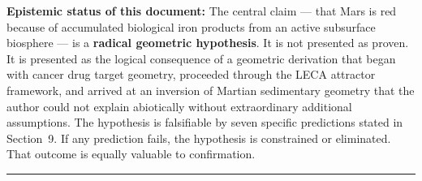 \documentclass[11pt, a4paper]{article}
\begin{document}
\vspace{1em}

\begin{mdframed}[
  linecolor=rulecolor,
  linewidth=0.8pt,
  innertopmargin=0.5em,
  innerbottommargin=0.5em,
  innerleftmargin=1em,
  innerrightmargin=1em
]
\small
\textbf{Epistemic status of this document:}
The central claim --- that Mars is red because
of accumulated biological iron products from an
active subsurface biosphere --- is a
\textbf{radical geometric hypothesis}.
It is not presented as proven. It is presented
as the logical consequence of a geometric
derivation that began with cancer drug target
geometry, proceeded through the LECA attractor
framework, and arrived at an inversion of
Martian sedimentary geometry that the author
could not explain abiotically without
extraordinary additional assumptions.
The hypothesis is falsifiable by seven
specific predictions stated in Section~9.
If any prediction fails, the hypothesis is
constrained or eliminated. That outcome is
equally valuable to confirmation.
\end{mdframed}

\vspace{0.5em}
\noindent\textcolor{rulecolor}{\rule{\linewidth}{0.6pt}}
\end{document}

